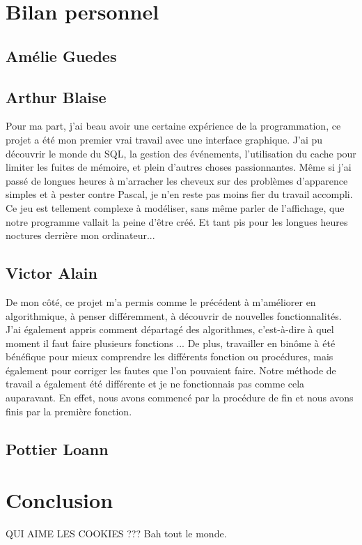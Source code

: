 \documentclass[12pt]{report}
\begin{document}
\vspace{15pt}
\section{Bilan personnel}
\subsection{Amélie Guedes}

\subsection{Arthur Blaise}
Pour ma part, j'ai beau avoir une certaine expérience de la programmation, ce projet a été mon premier vrai travail avec une interface graphique. J'ai pu découvrir le monde du SQL, la gestion des événements, l'utilisation du cache pour limiter les fuites de mémoire, et plein d'autres choses passionnantes. Même si j'ai passé de longues heures à m'arracher les cheveux sur des problèmes d'apparence simples et à pester contre Pascal, je n'en reste pas moins fier du travail accompli. Ce jeu est tellement complexe à modéliser, sans même parler de l'affichage, que notre programme vallait la peine d'être créé. Et tant pis pour les longues heures noctures derrière mon ordinateur...

\subsection{Victor Alain}

De mon côté, ce projet m'a permis comme le précédent à m'améliorer en algorithmique, à penser différemment, à découvrir de nouvelles fonctionnalités. J'ai également appris comment départagé des algorithmes, c'est-à-dire à quel moment il faut faire plusieurs fonctions ... De plus, travailler en binôme à été bénéfique pour mieux comprendre les différents fonction ou procédures, mais également pour corriger les fautes que l'on pouvaient faire. Notre méthode de travail a également été différente et je ne fonctionnais pas comme cela auparavant. En effet, nous avons commencé par la procédure de fin et nous avons finis par la première fonction.

\subsection{Pottier Loann}

\section{Conclusion}

QUI AIME LES COOKIES ??? Bah tout le monde. 
			
\end{document}
